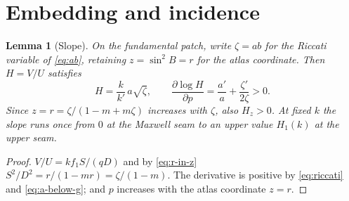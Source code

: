 \documentclass[11pt]{article}
\newtheorem{lemma}[theorem]{Lemma}
\theoremstyle{remark}
\begin{document}
\section{Embedding and incidence}\label{sec:embedding}

\begin{lemma}[Slope]\label{lem:slope}
On the fundamental patch, write $\zeta=ab$ for the Riccati variable of
\eqref{eq:ab}, retaining $z=\sin^2B=r$ for the atlas coordinate.  Then
$H=V/U$ satisfies
\begin{equation}\label{eq:H}
 H=\frac k{k'}\,a\sqrt\zeta,\qquad
 \frac{\partial\log H}{\partial p}=\frac{a'}a+\frac{\zeta'}{2\zeta}>0.
\end{equation}
Since $z=r=\zeta/(1-m+m\zeta)$ increases with $\zeta$, also $H_z>0$.
At fixed $k$ the slope runs once from $0$ at the Maxwell
seam to an upper value $H_1(k)$ at the upper seam.
\end{lemma}
\begin{proof}
$V/U=kf_1S/(qD)$ and by \eqref{eq:r-in-z}
$S^2/D^2=r/(1-mr)=\zeta/(1-m)$.  The derivative is positive by
\eqref{eq:riccati} and \eqref{eq:a-below-g}; and $p$ increases with the
atlas coordinate $z=r$.
\end{proof}
\end{document}

